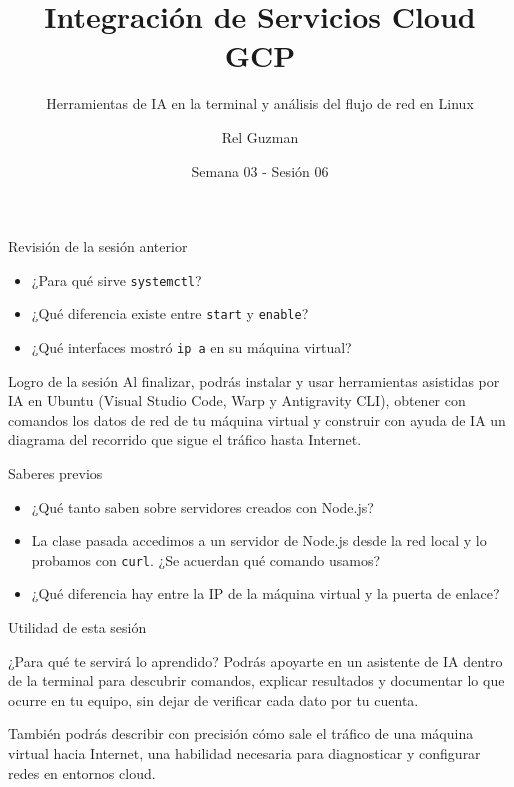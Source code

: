 \documentclass[aspectratio=169,10pt,c]{beamer}
\title{Integración de Servicios Cloud GCP}
\subtitle{Herramientas de IA en la terminal y análisis del flujo de red en Linux}
\date{Semana 03 - Sesión 06}
\author{Rel Guzman}
\begin{document}
{\maketitle}

\begin{frame}{Revisión de la sesión anterior}
\begin{itemize}\setlength\itemsep{10pt}
  \item ¿Para qué sirve \texttt{systemctl}?
  \item ¿Qué diferencia existe entre \texttt{start} y \texttt{enable}?
  \item ¿Qué interfaces mostró \texttt{ip a} en su máquina virtual?
\end{itemize}
\end{frame}

\begin{frame}[c]
\begin{block}{Logro de la sesión}
Al finalizar, podrás instalar y usar herramientas asistidas por IA en Ubuntu (Visual Studio Code, Warp y Antigravity CLI), obtener con comandos los datos de red de tu máquina virtual y construir con ayuda de IA un diagrama del recorrido que sigue el tráfico hasta Internet.
\end{block}
\end{frame}

\begin{frame}{Saberes previos}
\begin{itemize}\setlength\itemsep{10pt}
  \item ¿Qué tanto saben sobre servidores creados con Node.js?
  \item La clase pasada accedimos a un servidor de Node.js desde la red local y lo probamos con \texttt{curl}. ¿Se acuerdan qué comando usamos?
  \item ¿Qué diferencia hay entre la IP de la máquina virtual y la puerta de enlace?
\end{itemize}
\end{frame}

\begin{frame}{Utilidad de esta sesión}
\begin{block}{¿Para qué te servirá lo aprendido?}
Podrás apoyarte en un asistente de IA dentro de la terminal para descubrir comandos, explicar resultados y documentar lo que ocurre en tu equipo, sin dejar de verificar cada dato por tu cuenta.
\end{block}
\vspace{0.2cm}
\small También podrás describir con precisión cómo sale el tráfico de una máquina virtual hacia Internet, una habilidad necesaria para diagnosticar y configurar redes en entornos cloud.
\end{frame}
\end{document}
